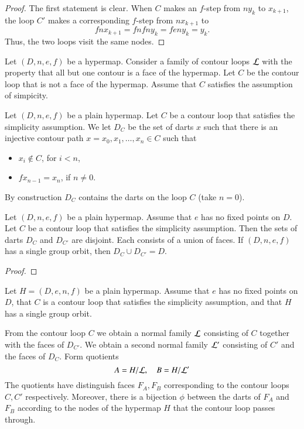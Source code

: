 \begin{proof}  The first statement is clear.  When $C$ makes an $f$-step
from $n y_k$ to $x_{k+1}$,  the loop $C'$ makes a corresponding $f$-step
from $n x_{k+1}$ to 
$$f n x_{k+1} = f n f n y_k = f e n y_k = y_k.$$  Thus, the two loops
visit the same nodes.
\end{proof}

\begin{lemma}  
Let $(D,n,e,f)$ be a hypermap.  
Consider a family of contour loops
$\cal L$ with the property that all but one contour is
a face of the hypermap.  Let $C$ be the contour loop that
is not a face of the hypermap.  Assume that $C$ satisfies the
assumption of simpicity.
\end{lemma}

Let $(D,n,e,f)$ be a plain hypermap.  Let $C$ be a contour loop
that satisfies the simplicity assumption.  
We let $D_C$ be the set of darts $x$ such that there is an injective
contour path $x=x_0,x_1,\ldots,x_n\in C$ such that
\begin{itemize}
\item $x_i\not\in C$, for $i<n$,
\item $f x_{n-1} = x_n$, if $n\ne 0$.
\end{itemize}
By construction $D_C$ contains the darts on the loop $C$ (take $n=0$).

\begin{lemma} Let $(D,n,e,f)$ be a plain hypermap.  
Assume that $e$ has no fixed points on $D$.
Let $C$ be a contour
loop that satisfies the simplicity assumption.  Then
the sets of darts $D_C$ and $D_{C'}$ are disjoint.  Each consists
of a union of faces.  If $(D,n,e,f)$ has a single group orbit, then
$D_C \cup D_{C'}=D$.
\end{lemma}

\begin{proof}
\end{proof}

Let $H=(D,e,n,f)$ be a plain hypermap.  Assume that $e$ has
no fixed points on $D$, that $C$ is a contour loop that satisfies
the simplicity assumption, and that $H$ has a single group orbit.

From the contour loop $C$ we obtain a normal family ${\cal L}$ consisting
of $C$ together with the faces of $D_{C'}$.  We obtain a second
normal family ${\cal L}'$ consisting of $C'$ and the faces of $D_C$.
Form quotients
  $$A= H/{\cal L},\quad B=H/{\cal L}'$$
The quotients have  distinguish faces $F_A,F_B$ corresponding to the
contour loops $C,C'$ respectively.  Moreover, there is a bijection $\phi$
between the darts of $F_A$ and $F_B$ according to the nodes of the hypermap $H$ that the contour loop passes through.

